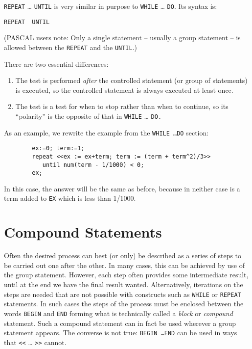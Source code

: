 \texttt{REPEAT} \ldots{} \texttt{UNTIL} is very similar
in purpose to \texttt{WHILE} \ldots{} \texttt{DO}.  Its syntax is:
\begin{syntax}
        \texttt{REPEAT }\texttt{ UNTIL }
\end{syntax}
(PASCAL users note: Only a single statement -- usually a group statement
-- is allowed between the \texttt{REPEAT} and the \texttt{UNTIL}.)

There are two essential differences:
\begin{enumerate}
\item The test is performed \emph{after} the controlled statement (or group of
statements) is executed, so the controlled statement is always executed at
least once.

\item The test is a test for when to stop rather than when to continue, so its
``polarity'' is the opposite of that in \texttt{WHILE} \ldots{} \texttt{DO.}
\end{enumerate}

As an example, we rewrite the example from the \texttt{WHILE \ldots DO} section:
\begin{samepage}
\begin{verbatim}
        ex:=0; term:=1;
        repeat <<ex := ex+term; term := (term + term^2)/3>>
           until num(term - 1/1000) < 0;
        ex;
\end{verbatim}
\end{samepage}
In this case, the answer will be the same as before, because in neither
case is a term added to \texttt{EX} which is less than 1/1000.

\section{Compound Statements}
\hypertarget{command:BEGIN}{}

Often the desired process
can best (or only) be
described as a series of steps to be carried out one after the other.  In
many cases, this can be achieved by use of the group statement.  However, each step often provides some intermediate
result, until at the end we have the final result wanted.  Alternatively,
iterations on the steps are needed that are not possible with constructs
such as \texttt{WHILE} or \texttt{REPEAT}
statements.  In such cases the steps of the process must be
enclosed between the words \texttt{BEGIN} and \texttt{END} forming what is technically called a \emph{block} or
\emph{compound} statement.  Such a compound statement can in fact be used
wherever a group statement appears.  The converse is not true: {\tt BEGIN
\ldots END} can be used in ways 
that \texttt{<}\texttt{<} \ldots{} \texttt{>}\texttt{>} cannot.

